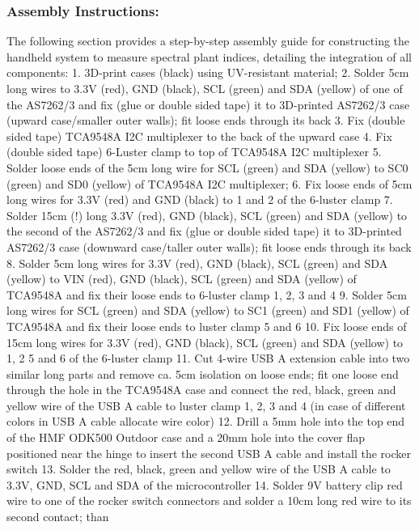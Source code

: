 \documentclass[
  11pt,
  letterpaper,
]{book}
\begin{document}
\subsubsection{Assembly
Instructions:}\label{sec-handheld-spectral-assembly}

The following section provides a step-by-step assembly guide for
constructing the handheld system to measure spectral plant indices,
detailing the integration of all components: 1. 3D-print cases (black)
using UV-resistant material; 2. Solder 5cm long wires to 3.3V (red), GND
(black), SCL (green) and SDA (yellow) of one of the AS7262/3 and fix
(glue or double sided tape) it to 3D-printed AS7262/3 case (upward
case/smaller outer walls); fit loose ends through its back 3. Fix
(double sided tape) TCA9548A I2C multiplexer to the back of the upward
case 4. Fix (double sided tape) 6-Luster clamp to top of TCA9548A I2C
multiplexer 5. Solder loose ends of the 5cm long wire for SCL (green)
and SDA (yellow) to SC0 (green) and SD0 (yellow) of TCA9548A I2C
multiplexer; 6. Fix loose ends of 5cm long wires for 3.3V (red) and GND
(black) to 1 and 2 of the 6-luster clamp 7. Solder 15cm (!) long 3.3V
(red), GND (black), SCL (green) and SDA (yellow) to the second of the
AS7262/3 and fix (glue or double sided tape) it to 3D-printed AS7262/3
case (downward case/taller outer walls); fit loose ends through its back
8. Solder 5cm long wires for 3.3V (red), GND (black), SCL (green) and
SDA (yellow) to VIN (red), GND (black), SCL (green) and SDA (yellow) of
TCA9548A and fix their loose ends to 6-luster clamp 1, 2, 3 and 4 9.
Solder 5cm long wires for SCL (green) and SDA (yellow) to SC1 (green)
and SD1 (yellow) of TCA9548A and fix their loose ends to luster clamp 5
and 6 10. Fix loose ends of 15cm long wires for 3.3V (red), GND (black),
SCL (green) and SDA (yellow) to 1, 2 5 and 6 of the 6-luster clamp 11.
Cut 4-wire USB A extension cable into two similar long parts and remove
ca. 5cm isolation on loose ends; fit one loose end through the hole in
the TCA9548A case and connect the red, black, green and yellow wire of
the USB A cable to luster clamp 1, 2, 3 and 4 (in case of different
colors in USB A cable allocate wire color) 12. Drill a 5mm hole into the
top end of the HMF ODK500 Outdoor case and a 20mm hole into the cover
flap positioned near the hinge to insert the second USB A cable and
install the rocker switch 13. Solder the red, black, green and yellow
wire of the USB A cable to 3.3V, GND, SCL and SDA of the microcontroller
14. Solder 9V battery clip red wire to one of the rocker switch
connectors and solder a 10cm long red wire to its second contact; than
\end{document}
